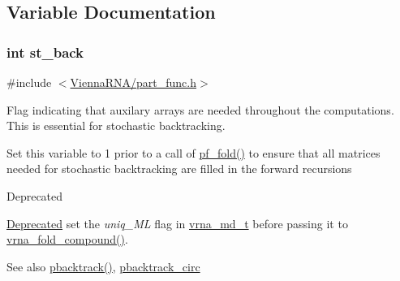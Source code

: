 \subsection{Variable Documentation}
\subsubsection[{\texorpdfstring{st\+\_\+back}{st_back}}]{\setlength{\rightskip}{0pt plus 5cm}int st\+\_\+back}\hypertarget{group__subopt__stochbt_gacd79b1a570e6ad9be24cb11fe8cae30a}{}\label{group__subopt__stochbt_gacd79b1a570e6ad9be24cb11fe8cae30a}


{\ttfamily \#include $<$\hyperlink{part__func_8h}{Vienna\+R\+N\+A/part\+\_\+func.\+h}$>$}



Flag indicating that auxilary arrays are needed throughout the computations. This is essential for stochastic backtracking. 

Set this variable to 1 prior to a call of \hyperlink{group__pf__fold_gadc3db3d98742427e7001a7fd36ef28c2}{pf\+\_\+fold()} to ensure that all matrices needed for stochastic backtracking are filled in the forward recursions

\begin{DoxyRefDesc}{Deprecated}
\item[\hyperlink{deprecated__deprecated000100}{Deprecated}]set the {\itshape uniq\+\_\+\+ML} flag in \hyperlink{group__model__details_ga1f8a10e12a0a1915f2a4eff0b28ea17c}{vrna\+\_\+md\+\_\+t} before passing it to \hyperlink{group__fold__compound_ga6601d994ba32b11511b36f68b08403be}{vrna\+\_\+fold\+\_\+compound()}.\end{DoxyRefDesc}


\begin{DoxySeeAlso}{See also}
\hyperlink{group__subopt__stochbt_gac03ca6db186bb3bf0a2a326d7fb3ba03}{pbacktrack()}, \hyperlink{group__subopt__stochbt_ga00474051204ac9ad576b3e45174d03ff}{pbacktrack\+\_\+circ} 
\end{DoxySeeAlso}
